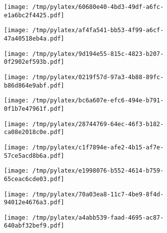 \documentclass{article}
\begin{document}
\begin{figure}[htbp]
\begin{subfigure}[b]{.3\linewidth}
\texttt{[image: /tmp/pylatex/60680e40-4bd3-49df-a6fc-e1a6bc2f4425.pdf]}
\end{subfigure}
\begin{subfigure}[b]{.3\linewidth}
\texttt{[image: /tmp/pylatex/af4fa541-bb53-4f99-a6cf-47a40518eb4a.pdf]}
\end{subfigure}
\begin{subfigure}[b]{.3\linewidth}
\texttt{[image: /tmp/pylatex/9d194e55-815c-4823-b207-0f2902ef593b.pdf]}
\end{subfigure}
\begin{subfigure}[b]{.3\linewidth}
\texttt{[image: /tmp/pylatex/0219f57d-97a3-4b88-89fc-b86d864e9abf.pdf]}
\end{subfigure}
\begin{subfigure}[b]{.3\linewidth}
\texttt{[image: /tmp/pylatex/bc6a607e-efc6-494e-b791-0f1b7e47961f.pdf]}
\end{subfigure}
\begin{subfigure}[b]{.3\linewidth}
\texttt{[image: /tmp/pylatex/28744769-64ec-46f3-b182-ca08e2018c0e.pdf]}
\end{subfigure}
\begin{subfigure}[b]{.3\linewidth}
\texttt{[image: /tmp/pylatex/c1f7894e-afe2-4b15-af7e-57ce5acd8b6a.pdf]}
\end{subfigure}
\begin{subfigure}[b]{.3\linewidth}
\texttt{[image: /tmp/pylatex/e1998076-b552-4614-b759-65ceac6cde03.pdf]}
\end{subfigure}
\begin{subfigure}[b]{.3\linewidth}
\texttt{[image: /tmp/pylatex/70a03ea8-11c7-4be9-8f4d-94012e4676a3.pdf]}
\end{subfigure}
\begin{subfigure}[b]{.3\linewidth}
\texttt{[image: /tmp/pylatex/a4abb539-faad-4695-ac87-640abf32bef9.pdf]}
\end{subfigure}
\end{figure}
\end{document}
